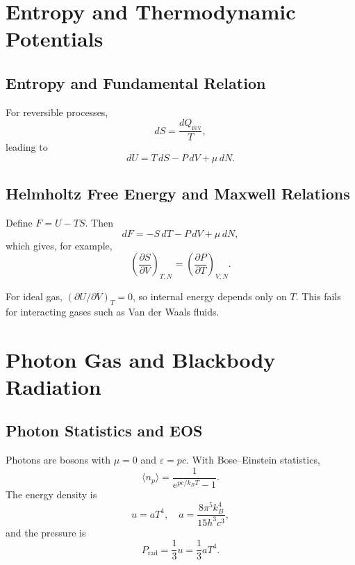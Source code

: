 \section{Entropy and Thermodynamic Potentials}

\subsection{Entropy and Fundamental Relation}
\begin{theory}
For reversible processes,
\begin{equation}
    dS = \frac{dQ_{\text{rev}}}{T},
\end{equation}
leading to
\begin{equation}
    dU = T\,dS - P\,dV + \mu\,dN.
\end{equation}
\end{theory}

\subsection{Helmholtz Free Energy and Maxwell Relations}
\begin{foundation}
Define $F=U-TS$. Then
\begin{equation}
    dF=-S\,dT-P\,dV+\mu\,dN,
\end{equation}
which gives, for example,
\begin{equation}
    \left(\frac{\partial S}{\partial V}\right)_{T,N}=\left(\frac{\partial P}{\partial T}\right)_{V,N}.
\end{equation}
\end{foundation}

\begin{remark}
For ideal gas, $(\partial U/\partial V)_T=0$, so internal energy depends only on $T$.
This fails for interacting gases such as Van der Waals fluids.
\end{remark}

\section{Photon Gas and Blackbody Radiation}

\subsection{Photon Statistics and EOS}
\begin{theory}
Photons are bosons with $\mu=0$ and $\varepsilon=pc$.
With Bose--Einstein statistics,
\begin{equation}
    \langle n_p\rangle = \frac{1}{e^{pc/k_B T}-1}.
\end{equation}
The energy density is
\begin{equation}
    u=aT^4,\quad a=\frac{8\pi^5k_B^4}{15h^3c^3},
\end{equation}
and the pressure is
\begin{equation}
    P_{\text{rad}}=\frac{1}{3}u=\frac{1}{3}aT^4.
\end{equation}
\end{theory}

